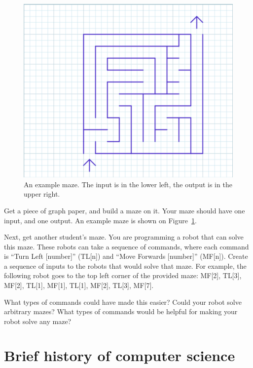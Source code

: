\begin{figure}
  \centering
    \includegraphics[scale=.4]{graph-paper.png}
    \caption{An example maze. The input is in the lower left, the output is in
      the upper right.}
    \label{fig:graph-paper}
\end{figure}

\begin{exercise}
  Get a piece of graph paper, and build a maze on it. Your maze should have one
  input, and one output. An example maze is shown on
  Figure~\ref{fig:graph-paper}.

  Next, get another student's maze. You are programming a robot that can solve
  this maze. These robots can take a sequence of commands, where each command is
  ``Turn Left [number]'' (TL[n]) and ``Move Forwards [number]'' (MF[n]). Create a sequence of inputs to the robots
  that would solve that maze.  For example, the following robot goes to the top
  left corner of the provided maze: MF[2], TL[3], MF[2],
  TL[1], MF[1], TL[1], MF[2], TL[3], MF[7].

  What types of commands could have made this easier? Could your robot solve
  arbitrary mazes? What types of commands would be helpful for making your robot
  solve any maze?
\end{exercise}

\section{Brief history of computer science}

